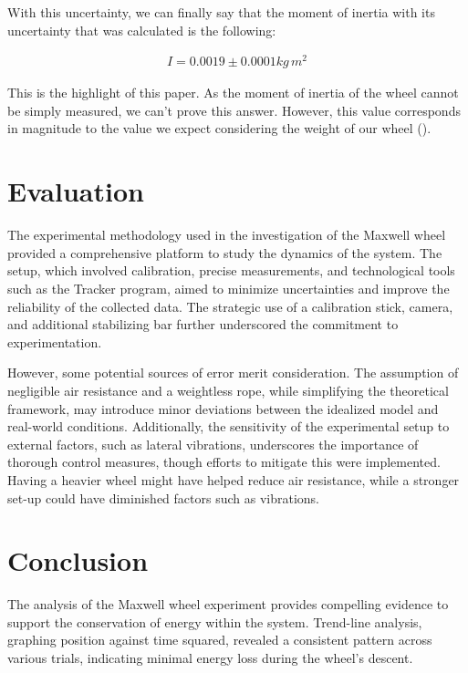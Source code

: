 \documentclass{article}
\begin{document}
With this uncertainty, we can finally say that the moment of inertia with its uncertainty that was calculated is the following:

\vspace{-1cm}
\begin{align*}
I= 0.0019\pm0.0001kg\,m^2
\end{align*}

This is the highlight of this paper. As the moment of inertia of the wheel cannot be simply measured, we can't prove this answer. However, this value corresponds in magnitude to the value we expect considering the weight of our wheel (\cite{experimentalvalue}).


\section*{Evaluation}
The experimental methodology used in the investigation of the Maxwell wheel provided a comprehensive platform to study the dynamics of the system. The setup, which involved calibration, precise measurements, and technological tools such as the Tracker program, aimed to minimize uncertainties and improve the reliability of the collected data. The strategic use of a calibration stick, camera, and additional stabilizing bar further underscored the commitment to experimentation.

However, some potential sources of error merit consideration. The assumption of negligible air resistance and a weightless rope, while simplifying the theoretical framework, may introduce minor deviations between the idealized model and real-world conditions. Additionally, the sensitivity of the experimental setup to external factors, such as lateral vibrations, underscores the importance of thorough control measures, though efforts to mitigate this were implemented. Having a heavier wheel might have helped reduce air resistance, while a stronger set-up could have diminished factors such as vibrations.

\section*{Conclusion}
The analysis of the Maxwell wheel experiment provides compelling evidence to support the conservation of energy within the system. Trend-line analysis, graphing position against time squared, revealed a consistent pattern across various trials, indicating minimal energy loss during the wheel's descent.
\end{document}
